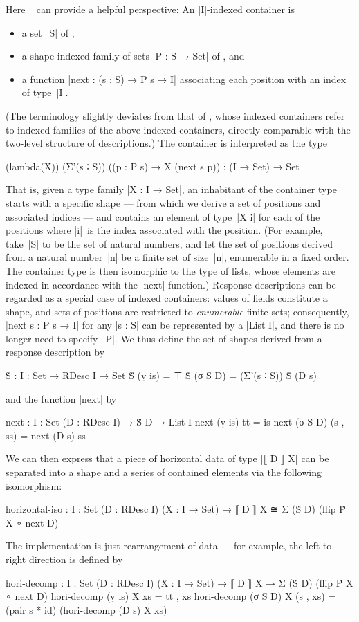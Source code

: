 Here ~\citep[Chapter~8]{Morris-thesis} can provide a helpful perspective:
An |I|-indexed container is
\begin{itemize}
\item a set~|S| of ,
\item a shape-indexed family of sets |P : S → Set| of , and
\item a function |next : (s : S) → P s → I| associating each position with an index of type~|I|.
\end{itemize}
(The terminology slightly deviates from that of \citeauthor{Morris-thesis}, whose indexed containers refer to indexed families of the above indexed containers, directly comparable with the two-level structure of descriptions.)
The container is interpreted as the type
\begin{code}
(lambda(X)) (Σ'(s ∶ S)) ((p : P s) → X (next s p)) : (I → Set) → Set
\end{code}
That is, given a type family |X : I → Set|, an inhabitant of the container type starts with a specific shape --- from which we derive a set of positions and associated indices --- and contains an element of type~|X i| for each of the positions where |i|~is the index associated with the position.
(For example, take~|S| to be the set of natural numbers, and let the set of positions derived from a natural number~|n| be a finite set of size~|n|, enumerable in a fixed order.
The container type is then isomorphic to the type of lists, whose elements are indexed in accordance with the |next| function.)
Response descriptions can be regarded as a special case of indexed containers: values of fields constitute a shape, and sets of positions are restricted to \emph{enumerable} finite sets; consequently, |next s : P s → I| for any |s : S| can be represented by a |List I|, and there is no longer need to specify~|P|.
We thus define the set of shapes derived from a response description by
\begin{code}
Ṡ : {I : Set} → RDesc I → Set
Ṡ (ṿ is)   = ⊤
Ṡ (σ S D)  = (Σ'(s ∶ S)) Ṡ (D s)
\end{code}
and the function |next| by
\begin{code}
next : {I : Set} (D : RDesc I) → Ṡ D → List I
next (ṿ is)   tt        = is
next (σ S D)  (s , ss)  = next (D s) ss
\end{code}
We can then express that a piece of horizontal data of type |⟦ D ⟧ X| can be separated into a shape and a series of contained elements via the following isomorphism:
\begin{code}
horizontal-iso :  {I : Set} (D : RDesc I) (X : I → Set) →
                  ⟦ D ⟧ X ≅ Σ (Ṡ D) (flip Ṗ X ∘ next D)
\end{code}
The implementation is just rearrangement of data --- for example, the left-to-right direction is defined by
\begin{code}
hori-decomp :  {I : Set} (D : RDesc I) (X : I → Set) →
               ⟦ D ⟧ X → Σ (Ṡ D) (flip Ṗ X ∘ next D)
hori-decomp (ṿ is)   X xs        = tt , xs
hori-decomp (σ S D)  X (s , xs)  = (pair s * id) (hori-decomp (D s) X xs)
\end{code}


